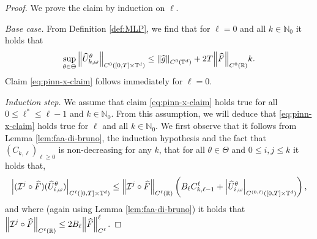 \documentclass{article}
\numberwithin{equation}{section}
\newcommand{\T}{\mathbb{T}}
\newcommand{\R}{\mathbb{R}}
\newcommand{\N}{\mathbb{N}}
\newcommand{\cI}{\mathcal{I}}
\newcommand{\1}{\mathbbm{1}}
\newcommand{\Fhat}{\widehat{F}}
\newcommand{\Uhat}{\widehat{U}}
\newcommand{\ghat}{\widehat{g}}
\begin{document}
\begin{proof}
We prove the claim by induction on $\ell$. 

\textit{Base case.} From Definition \ref{def:MLP}, we find that for $\ell = 0$ and all $k\in\N_0$ it holds that
\begin{equation}\label{eq:base-case}
    \sup_{\theta\in\Theta} \norm{\Uhat^\theta_{k,\omega}}_{C^{0}([0,T]\times\T^d)} \leq \norm{\ghat}_{C^{0}(\T^d)} + 2T\norm{\Fhat}_{C^{0}(\R)}k. 
\end{equation}
Claim \eqref{eq:pinn-x-claim} follows immediately for $\ell=0$. 

\textit{Induction step.} We assume that claim \eqref{eq:pinn-x-claim} holds true for all $0\leq \ell^*\leq \ell-1$ and $k\in\N_0$. From this assumption, we will deduce that \eqref{eq:pinn-x-claim} holds true for $\ell$ and all $k\in\N_0$. We first observe that it follows from Lemma \ref{lem:faa-di-bruno}, the induction hypothesis and the fact that $(C_{k,\ell})_{\ell\geq0}$ is non-decreasing for any $k$, that for all $\theta\in\Theta$ and $0\leq i,j\leq k$ it holds that,
\begin{equation}\label{eq:composition-chain-rule}
\begin{split}
    \abs{ (\cI^j\circ\Fhat)(\Uhat^{\theta}_{i,\omega})}_{C^\ell([0,T]\times\T^d)} \leq \norm{\cI^j\circ\Fhat}_{C^{\ell}(\R)}\left(B_\ell C_{k,\ell-1}^\ell+ \abs{ \Uhat^{\theta}_{i,\omega}}_{C^{(0,\ell)}([0,T]\times\T^d)}\right),
\end{split}
\end{equation}
and where (again using Lemma \ref{lem:faa-di-bruno}) it holds that $\norm{\cI^j\circ\Fhat}_{C^{\ell}(\R)} \leq 2B_\ell \norm{\Fhat}_{C^{\ell}}^\ell$. 


\end{proof}
\end{document}
